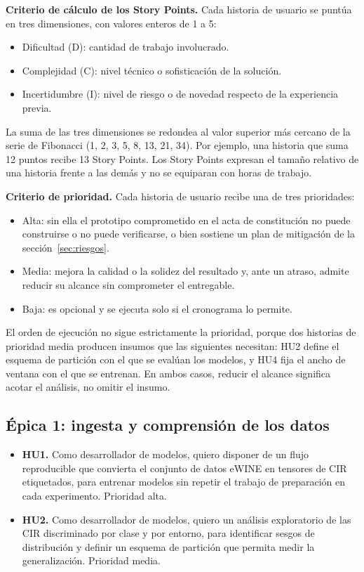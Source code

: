 \documentclass[
11pt, %
]{charter}
\begin{document}
\textbf{Criterio de cálculo de los Story Points.} Cada historia de usuario se puntúa en tres dimensiones, con valores enteros de 1 a 5:

\begin{itemize}
    \item Dificultad (D): cantidad de trabajo involucrado.
    \item Complejidad (C): nivel técnico o sofisticación de la solución.
    \item Incertidumbre (I): nivel de riesgo o de novedad respecto de la experiencia previa.
\end{itemize}

La suma de las tres dimensiones se redondea al valor superior más cercano de la serie de Fibonacci (1, 2, 3, 5, 8, 13, 21, 34). Por ejemplo, una historia que suma 12 puntos recibe 13 Story Points. Los Story Points expresan el tamaño relativo de una historia frente a las demás y no se equiparan con horas de trabajo.

\textbf{Criterio de prioridad.} Cada historia de usuario recibe una de tres prioridades:

\begin{itemize}
    \item Alta: sin ella el prototipo comprometido en el acta de constitución no puede construirse o no puede verificarse, o bien sostiene un plan de mitigación de la sección~\ref{sec:riesgos}.
    \item Media: mejora la calidad o la solidez del resultado y, ante un atraso, admite reducir su alcance sin comprometer el entregable.
    \item Baja: es opcional y se ejecuta solo si el cronograma lo permite.
\end{itemize}

El orden de ejecución no sigue estrictamente la prioridad, porque dos historias de prioridad media producen insumos que las siguientes necesitan: HU2 define el esquema de partición con el que se evalúan los modelos, y HU4 fija el ancho de ventana con el que se entrenan. En ambos casos, reducir el alcance significa acotar el análisis, no omitir el insumo.

\subsection{Épica 1: ingesta y comprensión de los datos}

\begin{itemize}
    \item \textbf{HU1.} Como desarrollador de modelos, quiero disponer de un flujo reproducible que convierta el conjunto de datos eWINE en tensores de CIR etiquetados, para entrenar modelos sin repetir el trabajo de preparación en cada experimento. Prioridad alta.
    \item \textbf{HU2.} Como desarrollador de modelos, quiero un análisis exploratorio de las CIR discriminado por clase y por entorno, para identificar sesgos de distribución y definir un esquema de partición que permita medir la generalización. Prioridad media.
\end{itemize}
\end{document}
